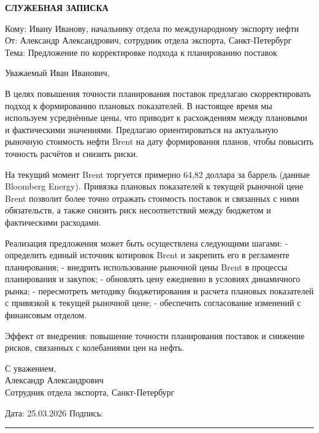 \documentclass[12pt]{article}
\begin{document}
\begin{center}
\textbf{\LARGE СЛУЖЕБНАЯ ЗАПИСКА}
\end{center}

\vspace{1cm}

Кому: Ивану Иванову, начальнику отдела по международному экспорту нефти \\
От: Александр Александрович, сотрудник отдела экспорта, Санкт-Петербург \\
Тема: Предложение по корректировке подхода к планированию поставок

Уважаемый Иван Иванович,

В целях повышения точности планирования поставок предлагаю скорректировать подход к формированию плановых показателей. В настоящее время мы используем усреднённые цены, что приводит к расхождениям между плановыми и фактическими значениями. Предлагаю ориентироваться на актуальную рыночную стоимость нефти Brent на дату формирования планов, чтобы повысить точность расчётов и снизить риски.

На текущий момент Brent торгуется примерно 64,82 доллара за баррель (данные Bloomberg Energy). Привязка плановых показателей к текущей рыночной цене Brent позволит более точно отражать стоимость поставок и связанных с ними обязательств, а также снизить риск несоответствий между бюджетом и фактическими расходами.

Реализация предложения может быть осуществлена следующими шагами:
- определить единый источник котировок Brent и закрепить его в регламенте планирования;
- внедрить использование рыночной цены Brent в процессы планирования и закупок;
- обновлять цену ежедневно в условиях динамичного рынка;
- пересмотреть методику бюджетирования и расчета плановых показателей с привязкой к текущей рыночной цене;
- обеспечить согласование изменений с финансовым отделом.

Эффект от внедрения: повышение точности планирования поставок и снижение рисков, связанных с колебаниями цен на нефть.

С уважением, \\
Александр Александрович \\
Сотрудник отдела экспорта, Санкт-Петербург

\vfill

\noindent
Дата: 25.03.2026 \hfill Подпись: \rule{5cm}{0.4pt}
\end{document}
